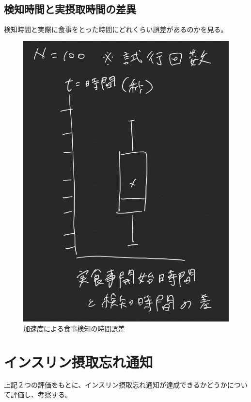 \subsection{検知時間と実摂取時間の差異}
検知時間と実際に食事をとった時間にどれくらい誤差があるのかを見る。

\begin{figure}[htbp]
  \caption{加速度による食事検知の時間誤差}
  \label{fig:meal_box_n_whisker}
  \begin{center}
    \includegraphics[bb=0 0 1000 850,width=20cm]{assets/meal_box_n_whisker.png}
  \end{center}
\end{figure}

\section{インスリン摂取忘れ通知}
上記２つの評価をもとに、インスリン摂取忘れ通知が達成できるかどうかについて評価し、考察する。

